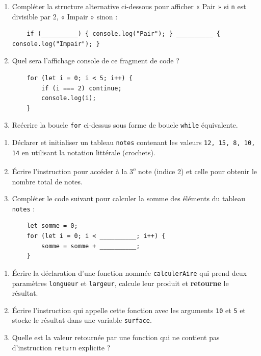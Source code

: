 \documentclass[11pt]{article}
\begin{document}
\begin{exercice}
\begin{enumerate}
    \item Compléter la structure alternative ci-dessous pour afficher « Pair » si \texttt{n} est divisible par 2, « Impair » sinon :
    \begin{verbatim}
    if (__________) { console.log("Pair"); } __________ { console.log("Impair"); }
    \end{verbatim}
    \item Quel sera l'affichage console de ce fragment de code ?
    \begin{verbatim}
    for (let i = 0; i < 5; i++) {
        if (i === 2) continue;
        console.log(i);
    }
    \end{verbatim}
    \item Reécrire la boucle \texttt{for} ci-dessus sous forme de boucle \texttt{while} équivalente.
\end{enumerate}
\end{exercice}

\begin{exercice}
\begin{enumerate}
    \item Déclarer et initialiser un tableau \texttt{notes} contenant les valeurs \texttt{12, 15, 8, 10, 14} en utilisant la notation littérale (crochets).
    \item Écrire l'instruction pour accéder à la 3\textsuperscript{e} note (indice 2) et celle pour obtenir le nombre total de notes.
    \item Compléter le code suivant pour calculer la somme des éléments du tableau \texttt{notes} :
    \begin{verbatim}
    let somme = 0;
    for (let i = 0; i < __________; i++) {
        somme = somme + __________;
    }
    \end{verbatim}
\end{enumerate}
\end{exercice}

\begin{exercice}
\begin{enumerate}
    \item Écrire la déclaration d'une fonction nommée \texttt{calculerAire} qui prend deux paramètres \texttt{longueur} et \texttt{largeur}, calcule leur produit et \textbf{retourne} le résultat.
    \item Écrire l'instruction qui appelle cette fonction avec les arguments \texttt{10} et \texttt{5} et stocke le résultat dans une variable \texttt{surface}.
    \item Quelle est la valeur retournée par une fonction qui ne contient pas d'instruction \texttt{return} explicite ?
\end{enumerate}
\end{exercice}
\end{document}

